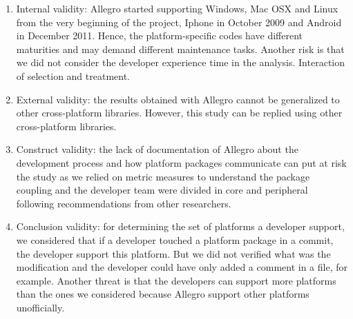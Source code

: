 \documentclass[10pt, conference]{IEEEtran}
\begin{document}
\begin{enumerate}

\item Internal validity: Allegro started supporting Windows, Mac OSX and Linux from the very beginning of the project, Iphone in October 2009 and Android in December 2011. Hence, the platform-specific codes have different maturities and may demand different maintenance tasks. Another risk is that we did not consider the developer experience time in the analysis.  
Interaction  of  selection  and  treatment.

\item External validity: the results obtained with Allegro cannot be generalized to other cross-platform libraries. However, this study can be replied using other cross-platform libraries.

\item Construct validity: the lack of documentation of Allegro about the development process and how platform packages communicate can put at risk the study as we relied on metric measures to understand the package coupling and the developer team were divided in core and peripheral following recommendations from other researchers. 

\item Conclusion validity: for determining the set of platforms a developer support, we considered that if a developer touched a platform package in a commit, the developer support this platform. But we did not verified  what was the modification and the developer could have only added a comment in a file, for example. Another threat is that the developers can support more platforms than the ones we considered because Allegro support other platforms unofficially. 

\end{enumerate}




\end{document}
